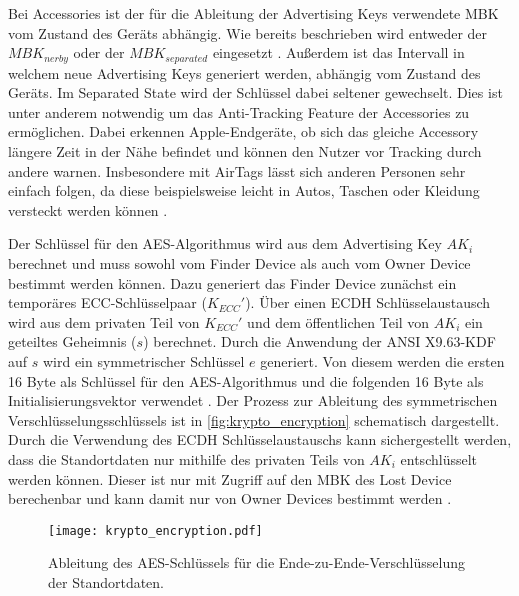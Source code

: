 Bei Accessories ist der für die Ableitung der Advertising Keys verwendete \ac{MBK} vom Zustand des Geräts abhängig.
Wie bereits beschrieben wird entweder der $MBK_{nerby}$ oder der  $MBK_{separated}$ eingesetzt \cite{Apple_FindMySpec}.
Außerdem ist das Intervall in welchem neue Advertising Keys generiert werden, abhängig vom Zustand des Geräts.
Im Separated State wird der Schlüssel dabei seltener gewechselt.
Dies ist unter anderem notwendig um das Anti-Tracking Feature der Accessories zu ermöglichen.
Dabei erkennen Apple-Endgeräte, ob sich das gleiche Accessory längere Zeit in der Nähe befindet und können den Nutzer vor Tracking durch andere warnen.
Insbesondere mit AirTags lässt sich anderen Personen sehr einfach folgen, da diese beispielsweise leicht in Autos, Taschen oder Kleidung versteckt werden können \cite{Heinrich_AirGuard}.


Der Schlüssel für den \ac{AES}-Algorithmus wird aus dem Advertising Key $AK_i$ berechnet und muss sowohl vom Finder Device als auch vom Owner Device bestimmt werden können.
Dazu generiert das Finder Device zunächst ein temporäres \ac{ECC}-Schlüsselpaar ($K_{ECC}'$).
Über einen \ac{ECDH} Schlüsselaustausch wird aus dem privaten Teil von $K_{ECC}'$ und dem öffentlichen Teil von $AK_i$ ein geteiltes Geheimnis ($s$) berechnet.
Durch die Anwendung der ANSI X9.63-\ac{KDF} auf $s$ wird ein symmetrischer Schlüssel $e$ generiert.
Von diesem werden die ersten 16 Byte als Schlüssel für den \ac{AES}-Algorithmus und die folgenden 16 Byte als Initialisierungsvektor verwendet \cite{Heinrich_FindMy}.
Der Prozess zur Ableitung des symmetrischen Verschlüsselungsschlüssels ist in \autoref{fig:krypto_encryption} schematisch dargestellt.
Durch die Verwendung des \ac{ECDH} Schlüsselaustauschs kann sichergestellt werden, dass die Standortdaten nur mithilfe des privaten Teils von $AK_i$ entschlüsselt werden können.
Dieser ist nur mit Zugriff auf den \ac{MBK} des Lost Device berechenbar und kann damit nur von Owner Devices bestimmt werden \cite{Heinrich_FindMy}.

\begin{figure}[ht]
    \centering
    \texttt{[image: krypto\_encryption.pdf]}
    \caption{Ableitung des \ac{AES}-Schlüssels für die Ende-zu-Ende-Verschlüsselung der Standortdaten.}
    \label{fig:krypto_encryption}
\end{figure}

